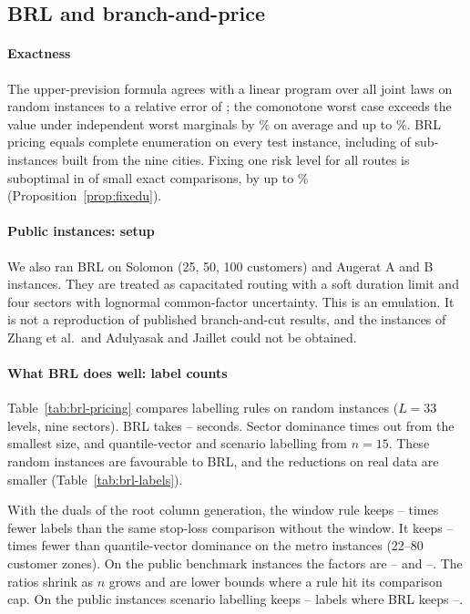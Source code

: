 \documentclass[preprint,11pt]{elsarticle}
\theoremstyle{definition}
\theoremstyle{remark}
\begin{document}
\subsection{BRL and branch-and-price}\label{sec:res-brl}

\paragraph{Exactness} The upper-prevision formula agrees with a linear program over all joint laws on \BRLtestAn{} random instances to a relative error of \BRLtestAerr; the comonotone worst case exceeds the value under independent worst marginals by \BRLindepMean\% on average and up to \BRLindepMax\%. BRL pricing equals complete enumeration on every test instance, including \BRLrealCmatch{} of \BRLrealCn{} sub-instances built from the nine cities. Fixing one risk level for all routes is suboptimal in \BRLfixeduSub{} of \BRLfixeduN{} small exact comparisons, by up to \BRLfixeduMax\% (Proposition~\ref{prop:fixedu}).

\paragraph{Public instances: setup} We also ran BRL on Solomon (25, 50, 100 customers) and Augerat A and B instances. They are treated as capacitated routing with a soft duration limit and four sectors with lognormal common-factor uncertainty. This is an emulation. It is not a reproduction of published branch-and-cut results, and the instances of Zhang et al.\ and Adulyasak and Jaillet could not be obtained.

\paragraph{What BRL does well: label counts} Table~\ref{tab:brl-pricing} compares labelling rules on random instances ($L=33$ levels, nine sectors). BRL takes \BRLtimeMin--\BRLtimeMax{} seconds. Sector dominance times out from the smallest size, and quantile-vector and scenario labelling from $n=15$. These random instances are favourable to BRL, and the reductions on real data are smaller (Table~\ref{tab:brl-labels}).

With the duals of the root column generation, the window rule keeps \BrlLabNowinMetroMin--\BrlLabNowinMetroMax{} times fewer labels than the same stop-loss comparison without the window. It keeps \BrlLabQvMetroMin--\BrlLabQvMetroMax{} times fewer than quantile-vector dominance on the metro instances (22--80 customer zones). On the public benchmark instances the factors are \BrlLabNowinPubMin--\BrlLabNowinPubMax{} and \BrlLabQvPubMin--\BrlLabQvPubMax. The ratios shrink as $n$ grows and are lower bounds where a rule hit its comparison cap. On the public instances scenario labelling keeps \BrlLabelsScenMin--\BrlLabelsScenMax{} labels where BRL keeps \BrlLabelsBrlMin--\BrlLabelsBrlMax.
\end{document}
